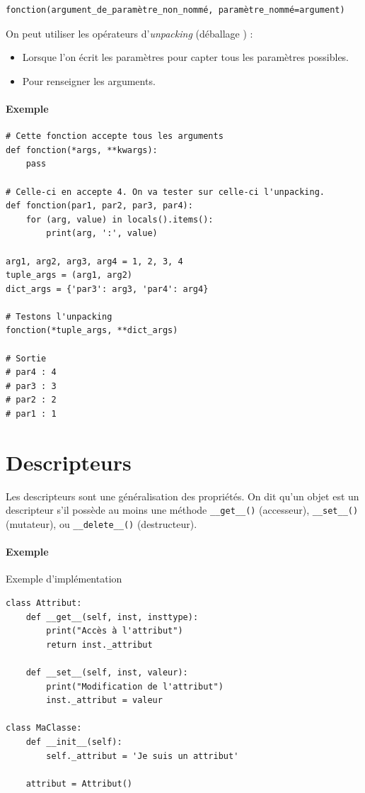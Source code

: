 \documentclass[a4paper, 10pt]{article}
\begin{document}
\begin{verbatim}
fonction(argument_de_paramètre_non_nommé, paramètre_nommé=argument)
\end{verbatim}

On peut utiliser les opérateurs d'\emph{unpacking} (\og déballage \fg{}) :
\begin{itemize}
    \item Lorsque l'on écrit les paramètres pour capter tous les paramètres possibles.
    \item Pour renseigner les arguments.
\end{itemize}

\paragraph{Exemple}
\begin{verbatim}
# Cette fonction accepte tous les arguments
def fonction(*args, **kwargs):
    pass

# Celle-ci en accepte 4. On va tester sur celle-ci l'unpacking.
def fonction(par1, par2, par3, par4):
    for (arg, value) in locals().items():
        print(arg, ':', value)

arg1, arg2, arg3, arg4 = 1, 2, 3, 4
tuple_args = (arg1, arg2)
dict_args = {'par3': arg3, 'par4': arg4}

# Testons l'unpacking
fonction(*tuple_args, **dict_args)

# Sortie
# par4 : 4
# par3 : 3
# par2 : 2
# par1 : 1
\end{verbatim}


\section{Descripteurs}
Les descripteurs sont une généralisation des propriétés. On dit qu'un objet est un descripteur s'il possède au moins une méthode \texttt{__get__()} (accesseur), \texttt{__set__()} (mutateur), ou \texttt{__delete__()} (destructeur).

\paragraph{Exemple} Exemple d'implémentation
\begin{verbatim}
class Attribut:
    def __get__(self, inst, insttype):
        print("Accès à l'attribut")
        return inst._attribut

    def __set__(self, inst, valeur):
        print("Modification de l'attribut")
        inst._attribut = valeur

class MaClasse:
    def __init__(self):
        self._attribut = 'Je suis un attribut'

    attribut = Attribut()
\end{verbatim}
\end{document}
